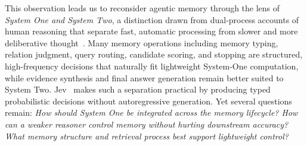 \documentclass[11pt]{article}
\begin{document}
This observation leads us to reconsider agentic memory through the lens of \emph{System One and System Two}, a distinction drawn from dual-process accounts of human reasoning that separate fast, automatic processing from slower and more deliberative thought~\citep{evans2008dual}. Many memory operations including memory typing, relation judgment, query routing, candidate scoring, and stopping are structured, high-frequency decisions that naturally fit lightweight System-One computation, while evidence synthesis and final answer generation remain better suited to System Two.
Jev~\cite{jev} makes such a separation practical by producing typed probabilistic decisions without autoregressive generation. Yet several questions remain: \emph{How should System One be integrated across the memory lifecycle? How can a weaker reasoner control memory without hurting downstream accuracy? What memory structure and retrieval process best support lightweight control?}


\end{document}
